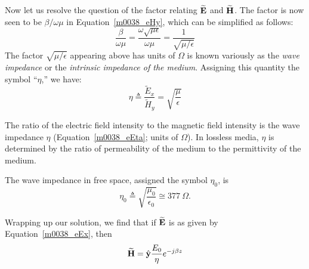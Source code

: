 Now let us resolve the question of the factor relating $\widetilde{\bf E}$ and $\widetilde{\bf H}$.
The factor is now seen to be $\beta/\omega\mu$ in Equation~\ref{m0038_eHy}, which can be simplified as follows: 
%
\begin{equation}
\frac{\beta}{\omega\mu} = \frac{\omega\sqrt{\mu\epsilon}}{\omega\mu} = \frac{1}{\sqrt{\mu/\epsilon}}
\end{equation}
%
The factor $\sqrt{\mu/\epsilon}$ appearing above has units of $\Omega$ is known variously as the \emph{wave impedance} 
or the \emph{intrinsic impedance of the medium}.
Assigning this quantity the symbol ``$\eta$,'' we have:
%
\begin{equation}
\boxed{
\eta \triangleq \frac{\widetilde{E}_x}{\widetilde{H}_y} = \sqrt{\frac{\mu}{\epsilon}}
}
\label{m0038_eEta}
\end{equation}
%
\begin{mdframed}[backgroundcolor=yellow!20,nobreak=true] 
The ratio of the electric field intensity to the magnetic field intensity is the wave impedance $\eta$ (Equation~\ref{m0038_eEta}; units of $\Omega$).  
In lossless media, $\eta$ is determined by the ratio of permeability of the medium to the permittivity of the medium. 
\end{mdframed}
%
The wave impedance in free space, assigned the symbol $\eta_0$, is
%
\begin{equation}
\eta_0 \triangleq \sqrt{\frac{\mu_0}{\epsilon_0}} \cong 377~\Omega. 
\end{equation}

Wrapping up our solution, we find that if $\widetilde{\bf E}$ is as given by Equation~\ref{m0038_eEx}, then
%
\begin{equation}
\widetilde{\bf H} = \hat{\bf y}\frac{E_0}{\eta} e^{-j\beta z}
\end{equation}


